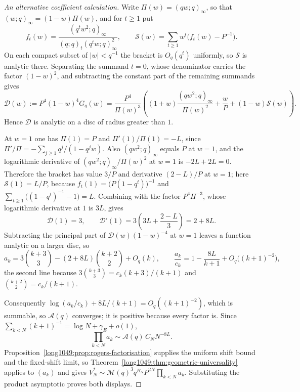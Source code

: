 \documentclass[11pt]{article}
\begin{document}
\begin{proof}[An alternative coefficient calculation]
Write $\Pi(w)=(qw;q)_\infty$, so that $(w;q)_\infty=(1-w)\Pi(w)$, and for
$t\ge1$ put
\[
 f_t(w)=\frac{(q^tw^2;q)_\infty}{(q;q)_t(q^tw;q)_\infty^2},
 \qquad
 \mathcal S(w)=\sum_{t\ge1}w^t\bigl(f_t(w)-P^{-1}\bigr).
\]
On each compact subset of $|w|<q^{-1}$ the bracket is $O_q(q^t)$ uniformly, so
$\mathcal S$ is analytic there. Separating the summand $t=0$, whose
denominator carries the factor $(1-w)^2$, and subtracting the constant part of
the remaining summands gives
\[
 \mathcal D(w):=P^4(1-w)^4G_q(w)
 =\frac{P^4}{\Pi(w)^3}
 \left((1+w)\frac{(qw^2;q)_\infty}{\Pi(w)^2}+\frac wP
       +(1-w)\mathcal S(w)\right).
\]
Hence $\mathcal D$ is analytic on a disc of radius greater than $1$.

At $w=1$ one has $\Pi(1)=P$ and $\Pi'(1)/\Pi(1)=-L$, since
$\Pi'/\Pi=-\sum_{j\ge1}q^j/(1-q^jw)$. Also $(qw^2;q)_\infty$ equals $P$ at
$w=1$, and the logarithmic derivative of $(qw^2;q)_\infty/\Pi(w)^2$ at $w=1$ is
$-2L+2L=0$. Therefore the bracket has value $3/P$ and derivative $(2-L)/P$
at $w=1$; here $\mathcal S(1)=L/P$, because
$f_t(1)=\bigl(P(1-q^t)\bigr)^{-1}$ and
$\sum_{t\ge1}\bigl((1-q^t)^{-1}-1\bigr)=L$. Combining with the factor
$P^4\Pi^{-3}$, whose logarithmic derivative at $1$ is $3L$, gives
\[
 \mathcal D(1)=3,\qquad
 \mathcal D'(1)=3\left(3L+\frac{2-L}3\right)=2+8L.
\]
Subtracting the principal part of $\mathcal D(w)(1-w)^{-4}$ at $w=1$ leaves a
function analytic on a larger disc, so
\[
 a_k=3\binom{k+3}3-(2+8L)\binom{k+2}2+O_q(k),
 \qquad
 \frac{a_k}{c_k}=1-\frac{8L}{k+1}+O_q\bigl((k+1)^{-2}\bigr),
\]
the second line because $3\binom{k+3}3=c_k(k+3)/(k+1)$ and
$\binom{k+2}2=c_k/(k+1)$.

Consequently $\log(a_k/c_k)+8L/(k+1)=O_q((k+1)^{-2})$, which is summable, so
$\mathcal A(q)$ converges; it is positive because every factor is. Since
$\sum_{k<N}(k+1)^{-1}=\log N+\gamma_{\!E}+o(1)$,
\[
 \prod_{k<N}a_k\sim\mathcal A(q)\,C_NN^{-8L}.
\]
Proposition~\ref{long1049:prop:rogers-factorisation} supplies the uniform shift
bound and the fixed-shift limit, so
Theorem~\ref{long1049:thm:geometric-universality} applies to $(a_k)$ and gives
$V_N^*\sim\mathcal M(q)^3q^{B_N}P^{2N}\prod_{k<N}a_k$. Substituting the product
asymptotic proves both displays.

\end{proof}
\end{document}
